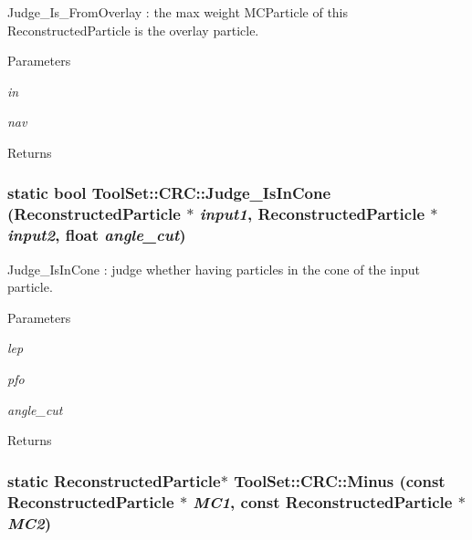 Judge\_\-Is\_\-FromOverlay : the max weight MCParticle of this ReconstructedParticle is the overlay particle. 
\begin{DoxyParams}{Parameters}
\item[{\em in}]\item[{\em nav}]\end{DoxyParams}
\begin{DoxyReturn}{Returns}

\end{DoxyReturn}
\hypertarget{classToolSet_1_1CRC_a28ee046a19ec975f344122b2f8c2f3bf}{
\subsubsection[{Judge\_\-IsInCone}]{\setlength{\rightskip}{0pt plus 5cm}static bool ToolSet::CRC::Judge\_\-IsInCone (ReconstructedParticle $\ast$ {\em input1}, \/  ReconstructedParticle $\ast$ {\em input2}, \/  float {\em angle\_\-cut})}}
\label{classToolSet_1_1CRC_a28ee046a19ec975f344122b2f8c2f3bf}


Judge\_\-IsInCone : judge whether having particles in the cone of the input particle. 
\begin{DoxyParams}{Parameters}
\item[{\em lep}]\item[{\em pfo}]\item[{\em angle\_\-cut}]\end{DoxyParams}
\begin{DoxyReturn}{Returns}

\end{DoxyReturn}
\hypertarget{classToolSet_1_1CRC_ac3a3e5e99a15fd8b409241d30f779663}{
\subsubsection[{Minus}]{\setlength{\rightskip}{0pt plus 5cm}static ReconstructedParticle$\ast$ ToolSet::CRC::Minus (const ReconstructedParticle $\ast$ {\em MC1}, \/  const ReconstructedParticle $\ast$ {\em MC2})}}
\label{classToolSet_1_1CRC_ac3a3e5e99a15fd8b409241d30f779663}


